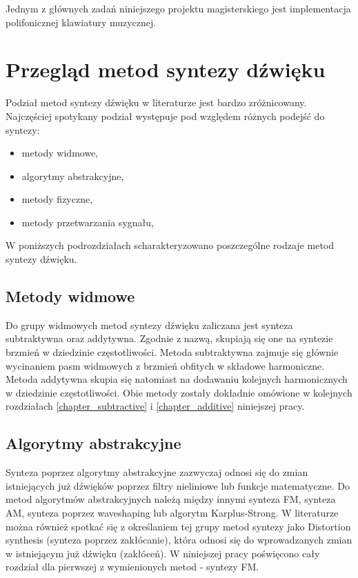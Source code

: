 %
%

Jednym z głównych zadań niniejszego projektu magisterskiego jest implementacja polifonicznej klawiatury muzycznej.



\section{Przegląd metod syntezy dźwięku}
Podział metod syntezy dźwięku w literaturze jest bardzo zróżnicowany. Najczęściej spotykany podział występuje pod względem różnych podejść do syntezy:
\begin{itemize}
	\item metody widmowe,
	\item algorytmy abstrakcyjne,
	\item metody fizyczne,
	\item metody przetwarzania sygnału,
\end{itemize}

W poniższych podrozdziałach scharakteryzowano poszczególne rodzaje metod syntezy dźwięku.

\subsection{Metody widmowe}
Do grupy widmowych metod syntezy dźwięku zaliczana jest synteza subtraktywna oraz addytywna. Zgodnie z nazwą, skupiają się one na syntezie brzmień w dziedzinie częstotliwości. Metoda subtraktywna zajmuje się głównie wycinaniem pasm widmowych z brzmień obfitych w składowe harmoniczne. Metoda addytywna skupia się natomiast na dodawaniu kolejnych harmonicznych w dziedzinie częstotliwości. Obie metody zostały dokładnie omówione w kolejnych rozdziałach \ref{chapter_subtractive} i \ref{chapter_additive} niniejszej pracy.

\subsection{Algorytmy abstrakcyjne}
Synteza poprzez algorytmy abstrakcyjne zazwyczaj odnosi się do zmian istniejących już dźwięków poprzez filtry nieliniowe lub funkcje matematyczne. Do metod algorytmów abstrakcyjnych należą między innymi synteza FM, synteza AM, synteza poprzez waveshaping lub algorytm Karplus-Strong. W literaturze można również spotkać się z określaniem tej grupy metod syntezy jako Distortion synthesis (synteza poprzez zakłócanie), która odnosi się do wprowadzanych zmian w istniejącym już dźwięku (zakłóceń). W niniejszej pracy poświęcono cały rozdział dla pierwszej z wymienionych metod - syntezy FM.

